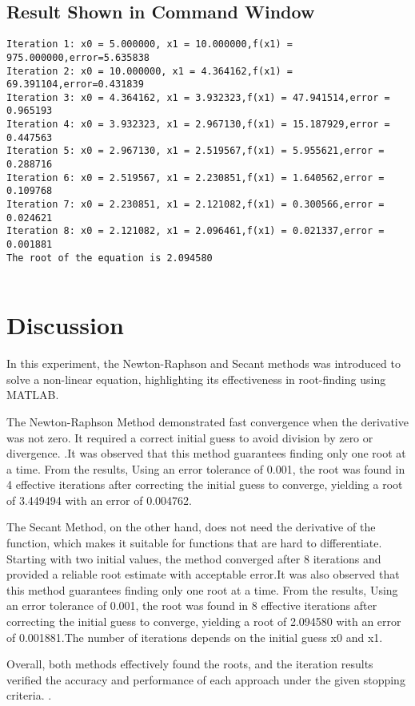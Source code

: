 \documentclass[a4paper,12pt]{article}
\begin{document}
	
	
	\newpage
	\subsection{Result Shown in Command Window}
	
	\begin{lstlisting}[style=vscode-light, caption={Command Window for Secant Method} ]
Iteration 1: x0 = 5.000000, x1 = 10.000000,f(x1) = 975.000000,error=5.635838
Iteration 2: x0 = 10.000000, x1 = 4.364162,f(x1) = 69.391104,error=0.431839
Iteration 3: x0 = 4.364162, x1 = 3.932323,f(x1) = 47.941514,error = 0.965193
Iteration 4: x0 = 3.932323, x1 = 2.967130,f(x1) = 15.187929,error = 0.447563
Iteration 5: x0 = 2.967130, x1 = 2.519567,f(x1) = 5.955621,error = 0.288716
Iteration 6: x0 = 2.519567, x1 = 2.230851,f(x1) = 1.640562,error = 0.109768
Iteration 7: x0 = 2.230851, x1 = 2.121082,f(x1) = 0.300566,error = 0.024621
Iteration 8: x0 = 2.121082, x1 = 2.096461,f(x1) = 0.021337,error = 0.001881
The root of the equation is 2.094580
		
	\end{lstlisting}
	
	
	
	
	
	\section{Discussion}
	In this experiment, the Newton-Raphson and Secant methods was introduced to solve a non-linear equation, highlighting its effectiveness in root-finding using MATLAB. 
	
	The Newton-Raphson Method demonstrated fast convergence when the derivative was not zero. It required a correct initial guess to avoid division by zero or divergence. .It was observed that this method guarantees finding only one root at a time. From the results, Using an error tolerance of 0.001, the root was found in 4 effective iterations after correcting the initial guess to converge, yielding a root of 3.449494 with an error of 0.004762. 
	
	The Secant Method, on the other hand, does not need the derivative of the function, which makes it suitable for functions that are hard to differentiate. Starting with two initial values, the method converged after 8 iterations and provided a reliable root estimate with acceptable error.It was also observed that this method guarantees finding only one root at a time. From the results, Using an error tolerance of 0.001, the root was found in 8 effective iterations after correcting the initial guess to converge, yielding a root of 2.094580 with an error of 0.001881.The number of iterations depends on the initial guess x0 and x1.
	
	Overall, both methods effectively found the roots, and the iteration results verified the accuracy and performance of each approach under the given stopping criteria.
.
	
	
	
	
	
	
	
	
\end{document}
